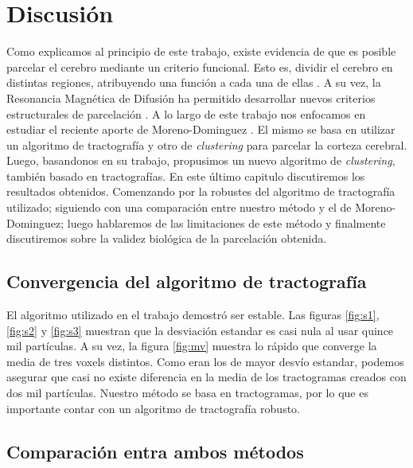 \chapter{Discusi\'on} 

Como explicamos al principio de este trabajo, existe evidencia de que es posible
parcelar el cerebro mediante un criterio funcional. Esto es, dividir el cerebro
en distintas regiones, atribuyendo una funci\'on a cada una de ellas \cite{Greicius2003}.
A su vez, la Resonancia Magn\'etica de Difusi\'on ha permitido desarrollar nuevos 
criterios estructurales de parcelaci\'on \cite{Taylor1985}. A lo largo de este
trabajo nos enfocamos en estudiar el reciente aporte de Moreno-Dominguez 
\cite{Moreno-Dominguez2014}. El mismo se basa en utilizar un algoritmo de
tractograf\'ia y otro de \textit{clustering} para parcelar la corteza cerebral. 
Luego, basandonos en su trabajo, propusimos un nuevo algoritmo de \textit{clustering},
tambi\'en basado en tractograf\'ias. En este \'ultimo capitulo discutiremos los 
resultados obtenidos. Comenzando por la robustes del algoritmo de tractograf\'ia
utilizado; siguiendo con una comparaci\'on entre nuestro m\'etodo y el de 
Moreno-Dominguez; luego hablaremos de las limitaciones de este m\'etodo y 
finalmente discutiremos sobre la validez biol\'ogica de la parcelaci\'on obtenida. \\


\section{Convergencia del algoritmo de tractograf\'ia}

El algoritmo utilizado en el trabajo demostr\'o ser estable. Las figuras 
\ref{fig:s1}, \ref{fig:s2} y \ref{fig:s3} muestran que la desviaci\'on estandar
es casi nula al usar quince mil part\'iculas. A su vez, la figura \ref{fig:mv}
muestra lo r\'apido que converge la media de tres voxels distintos. Como eran los 
de mayor desv\'io estandar, podemos asegurar que casi no existe diferencia en 
la media de los tractogramas creados con dos mil part\'iculas. Nuestro m\'etodo
se basa en tractogramas, por lo que es importante contar con un algoritmo de 
tractograf\'ia robusto.

\section{Comparaci\'on entra ambos m\'etodos}

